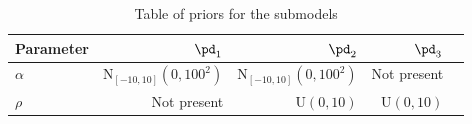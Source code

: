 \begin{table}[!h]
\centering
\caption{Table of priors for the submodels}
\begin{tabular}{>{\raggedright\arraybackslash}p{2cm}rrrr}
\toprule
Parameter & $\pd_{1}$ & $\pd_{2}$ & $\pd_{3}$ \\
\midrule
\rowcolor{gray!6}  $\alpha$ & $\text{N}_{[-10, 10]}(0, 100^2)$ & $\text{N}_{[-10, 10]}(0, 100^2)$ & Not present \\
$\rho$ & Not present & $\text{U}(0, 10)$ & $\text{U}(0, 10)$ \\
\bottomrule
\end{tabular}
\label{tab:prior_table}
\end{table}